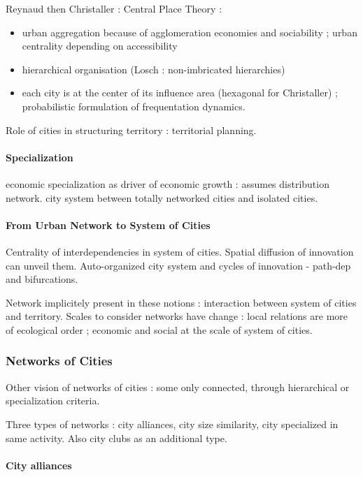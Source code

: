 Reynaud then Christaller : Central Place Theory :
\begin{itemize}
\item urban aggregation because of agglomeration economies and sociability ; urban centrality depending on accessibility
\item hierarchical organisation (Losch : non-imbricated hierarchies)
\item each city is at the center of its influence area (hexagonal for Christaller) ; probabilistic formulation of frequentation dynamics.
\end{itemize}

Role of cities in structuring territory : territorial planning.

\paragraph{Specialization}

economic specialization as driver of economic growth : assumes distribution network. city system between totally networked cities and isolated cities.

\paragraph{From Urban Network to System of Cities}

Centrality of interdependencies in system of cities. Spatial diffusion of innovation can unveil them. Auto-organized city system and cycles of innovation - path-dep and bifurcations.

Network implicitely present in these notions : interaction between system of cities and territory. Scales to consider networks have change : local relations are more of ecological order ; economic and social at the scale of system of cities.

\subsubsection{Networks of Cities}


Other vision of networks of cities : some only connected, through hierarchical or specialization criteria.

Three types of networks : city alliances, city size similarity, city specialized in same activity. Also city clubs as an additional type.

\paragraph{City alliances}


